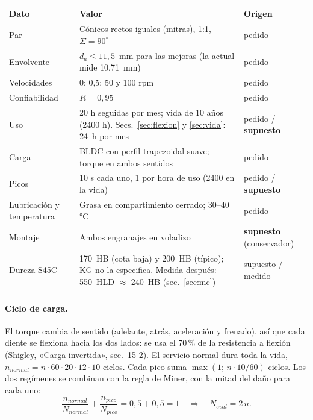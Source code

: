 \documentclass[11pt,a4paper]{article}
\begin{document}
\begin{table}[H]\centering\small
\begin{tabularx}{\linewidth}{l X l}
\toprule
Dato & Valor & Origen\\\midrule
Par & Cónicos rectos iguales (mitras), 1:1, $\Sigma=90^\circ$ & pedido\\
Envolvente & $d_a\le11{,}5$~mm para las mejoras (la actual mide 10,71~mm) & pedido\\
Velocidades & 0; 0,5; 50 y 100 rpm & pedido\\
Confiabilidad & $R=0{,}95$ & pedido\\
Uso & 20 h seguidas por mes; vida de 10 años (2400 h). Secs.~\ref{sec:flexion} y \ref{sec:vida}: 24~h por mes & pedido / \textbf{supuesto}\\
Carga & BLDC con perfil trapezoidal suave; torque en ambos sentidos & pedido\\
Picos & 10 s cada uno, 1 por hora de uso (2400 en la vida) & pedido / \textbf{supuesto}\\
Lubricación y temperatura & Grasa en compartimiento cerrado; 30--40\,°C & pedido\\
Montaje & Ambos engranajes en voladizo & \textbf{supuesto} (conservador)\\
Dureza S45C & 170~HB (cota baja) y 200~HB (típico); KG no la especifica. Medida después: 550~HLD $\approx$ 240~HB (sec.~\ref{sec:mc}) & supuesto / medido\\
\bottomrule
\end{tabularx}
\end{table}

\paragraph{Ciclo de carga.}
El torque cambia de sentido (adelante, atrás, aceleración y frenado), así que cada diente se flexiona hacia
los dos lados: se usa el 70\,\% de la resistencia a flexión (Shigley, «Carga invertida», sec.~15-2).
El servicio normal dura toda la vida, $n_{normal}=n\cdot60\cdot20\cdot12\cdot10$ ciclos. Cada pico suma
$\max(1;\,n\cdot10/60)$ ciclos. Los dos regímenes se combinan con la regla de Miner, con la mitad del daño para cada uno:
\begin{equation}
\frac{n_{normal}}{N_{normal}}+\frac{n_{pico}}{N_{pico}}=0{,}5+0{,}5=1
\quad\Rightarrow\quad N_{eval}=2\,n .
\end{equation}

\end{document}
